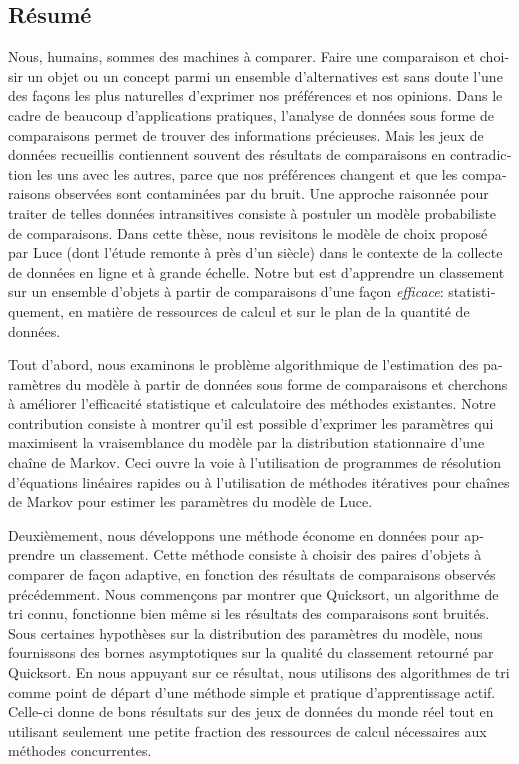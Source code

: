 \begin{otherlanguage}{french}
	\chapter*{Résumé}

	Nous, humains, sommes des machines à comparer.
	Faire une comparaison et choisir un objet ou un concept parmi un ensemble d'alternatives est sans doute l'une des façons les plus naturelles d'exprimer nos préférences et nos opinions.
	Dans le cadre de beaucoup d'applications pratiques, l'analyse de données sous forme de comparaisons permet de trouver des informations précieuses.
	Mais les jeux de données recueillis contiennent souvent des résultats de comparaisons en contradiction les uns avec les autres, parce que nos préférences changent et que les comparaisons observées sont contaminées par du bruit.
	Une approche raisonnée pour traiter de telles données intransitives consiste à postuler un modèle probabiliste de comparaisons.
	Dans cette thèse, nous revisitons le modèle de choix proposé par Luce (dont l'étude remonte à près d'un siècle) dans le contexte de la collecte de données en ligne et à grande échelle.
	Notre but est d'apprendre un classement sur un ensemble d'objets à partir de comparaisons d'une façon \emph{efficace}: statistiquement, en matière de ressources de calcul et sur le plan de la quantité de données.

	Tout d'abord, nous examinons le problème algorithmique de l'estimation des paramètres du modèle à partir de données sous forme de comparaisons et cherchons à améliorer l'efficacité statistique et calculatoire des méthodes existantes.
	Notre contribution consiste à montrer qu'il est possible d'exprimer les paramètres qui maximisent la vraisemblance du modèle par la distribution stationnaire d'une chaîne de Markov.
	Ceci ouvre la voie à l'utilisation de programmes de résolution d'équations linéaires rapides ou à l'utilisation de méthodes itératives pour chaînes de Markov pour estimer les paramètres du modèle de Luce.

	Deuxièmement, nous développons une méthode économe en données pour apprendre un classement.
	Cette méthode consiste à choisir des paires d'objets à comparer de façon adaptive, en fonction des résultats de comparaisons observés précédemment.
	Nous commençons par montrer que Quicksort, un algorithme de tri connu, fonctionne bien même si les résultats des comparaisons sont bruités.
	Sous certaines hypothèses sur la distribution des paramètres du modèle, nous fournissons des bornes asymptotiques sur la qualité du classement retourné par Quicksort.
	En nous appuyant sur ce résultat, nous utilisons des algorithmes de tri comme point de départ d'une méthode simple et pratique d'apprentissage actif.
	Celle-ci donne de bons résultats sur des jeux de données du monde réel tout en utilisant seulement une petite fraction des ressources de calcul nécessaires aux méthodes concurrentes.


\end{otherlanguage}

